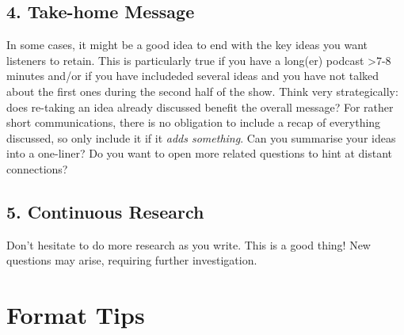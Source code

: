 \documentclass[
  letterpaper,
  DIV=11,
  numbers=noendperiod]{scrreprt}
\begin{document}
\subsection{4. Take-home Message}\label{take-home-message}

In some cases, it might be a good idea to end with the key ideas you
want listeners to retain. This is particularly true if you have a
long(er) podcast \textgreater7-8 minutes and/or if you have includeded
several ideas and you have not talked about the first ones during the
second half of the show. Think very strategically: does re-taking an
idea already discussed benefit the overall message? For rather short
communications, there is no obligation to include a recap of everything
discussed, so only include it if it \emph{adds something}. Can you
summarise your ideas into a one-liner? Do you want to open more related
questions to hint at distant connections?

\subsection{5. Continuous Research}\label{continuous-research}

Don't hesitate to do more research as you write. This is a good thing!
New questions may arise, requiring further investigation.

\section{Format Tips}\label{format-tips}
\end{document}
